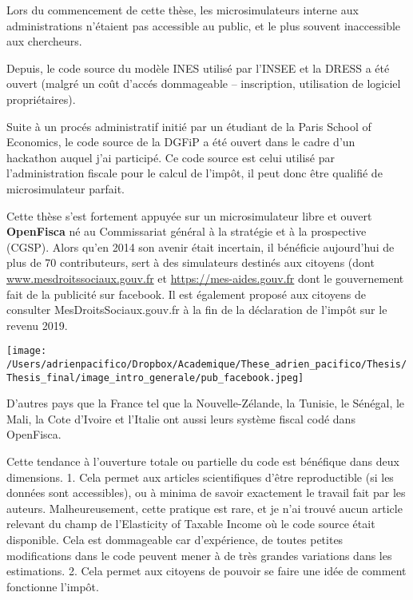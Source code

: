 Lors du commencement de cette thèse, les microsimulateurs interne aux
administrations n'étaient pas accessible au public, et le plus souvent
inaccessible aux chercheurs.

Depuis, le code source du modèle INES utilisé par l'INSEE et la DRESS a
été ouvert (malgré un coût d'accés dommageable -- inscription,
utilisation de logiciel propriétaires).

Suite à un procés administratif initié par un étudiant de la Paris
School of Economics, le code source de la DGFiP a été ouvert dans le
cadre d'un hackathon auquel j'ai participé. Ce code source est celui
utilisé par l'administration fiscale pour le calcul de l'impôt, il peut
donc être qualifié de microsimulateur parfait.

Cette thèse s'est fortement appuyée sur un microsimulateur libre et
ouvert \textbf{OpenFisca} né au Commissariat général à la stratégie et à
la prospective (CGSP). Alors qu'en 2014 son avenir était incertain, il
bénéficie aujourd'hui de plus de 70 contributeurs, sert à des
simulateurs destinés aux citoyens (dont
\href{https://www.mesdroitssociaux.gouv.fr}{www.mesdroitssociaux.gouv.fr}
et \url{https://mes-aides.gouv.fr} dont le gouvernement fait de la
publicité sur facebook. Il est également proposé aux citoyens de
consulter MesDroitsSociaux.gouv.fr à la fin de la déclaration de l'impôt
sur le revenu 2019.


\begin{center}
\texttt{[image: /Users/adrienpacifico/Dropbox/Academique/These\_adrien\_pacifico/Thesis/Thesis\_final/image\_intro\_generale/pub\_facebook.jpeg]}
\end{center}





D'autres pays que la France tel que la Nouvelle-Zélande, la Tunisie, le
Sénégal, le Mali, la Cote d'Ivoire et l'Italie ont aussi leurs système
fiscal codé dans OpenFisca.

Cette tendance à l'ouverture totale ou partielle du code est bénéfique
dans deux dimensions. 1. Cela permet aux articles scientifiques d'être
reproductible (si les données sont accessibles), ou à minima de savoir
exactement le travail fait par les auteurs. Malheureusement, cette
pratique est rare, et je n'ai trouvé aucun article relevant du champ de
l'Elasticity of Taxable Income où le code source était disponible. Cela
est dommageable car d'expérience, de toutes petites modifications dans
le code peuvent mener à de très grandes variations dans les estimations.
2. Cela permet aux citoyens de pouvoir se faire une idée de comment
fonctionne l'impôt.

